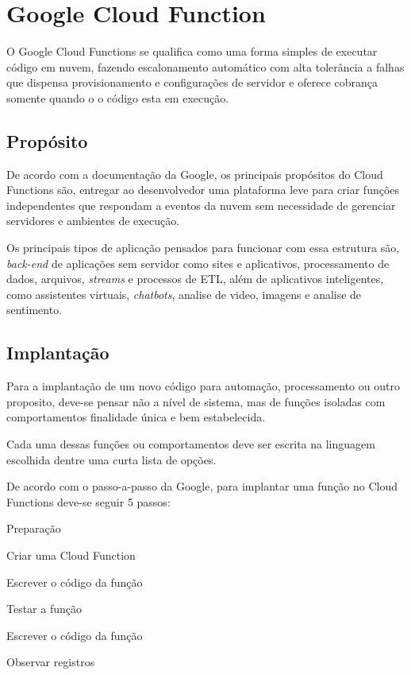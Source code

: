 \section{Google Cloud Function}

O Google Cloud Functions se qualifica como uma forma simples de executar código em nuvem, fazendo escalonamento automático com alta tolerância a falhas que dispensa provisionamento e configurações de servidor e oferece cobrança somente quando o o código esta em execução.

\subsection{Propósito}

De acordo com a documentação da Google, os principais propósitos do Cloud Functions são, entregar ao desenvolvedor uma plataforma leve para criar funções independentes que respondam a eventos da nuvem sem necessidade de gerenciar servidores e ambientes de execução.

Os principais tipos de aplicação pensados para funcionar com essa estrutura são, \textit{back-end} de aplicações sem servidor como sites e aplicativos, processamento de dados, arquivos, \textit{streams} e processos de ETL, além de aplicativos inteligentes, como assistentes virtuais, \textit{chatbots}, analise de video, imagens e analise de sentimento.

\subsection{Implantação}
Para a implantação de um novo código para automação, processamento ou outro proposito, deve-se pensar não a nível de sistema, mas de funções isoladas com comportamentos finalidade única e bem estabelecida. 

\bigskip
Cada uma dessas funções ou comportamentos deve ser escrita na linguagem escolhida dentre uma curta lista de opções. 

\bigskip
De acordo com o passo-a-passo da Google, para implantar uma função no Cloud Functions deve-se seguir 5 passos:
\begin{alineas}
	\item Preparação
	\item Criar uma Cloud Function
	\item Escrever o código da função
	\item Testar a função
	\item Escrever o código da função
	\item Observar registros
\end{alineas}

